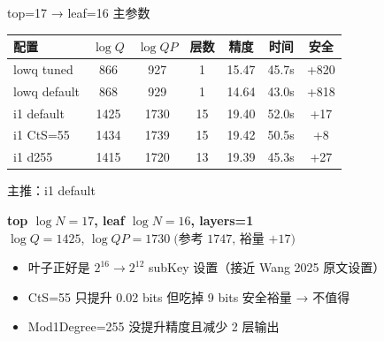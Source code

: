 \documentclass[aspectratio=169, 10pt, xcolor=svgnames, table, UTF8]{ctexbeamer}
\begin{document}
\begin{frame}{top=17 → leaf=16 主参数}
  \begin{center}
    \small
    \begin{tabular}{@{}lcccccc@{}}
      \toprule
      配置 & \(\log Q\) & \(\log QP\) & 层数 & 精度 & 时间 & 安全 \\
      \midrule
      lowq tuned & 866 & 927 & 1 & 15.47 & 45.7s & +820 \\
      lowq default & 868 & 929 & 1 & 14.64 & 43.0s & +818 \\
      \alert{i1 default} & 1425 & 1730 & 15 & \alert{19.40} & 52.0s & \alert{+17} \\
      i1 CtS=55 & 1434 & 1739 & 15 & 19.42 & 50.5s & +8 \\
      i1 d255 & 1415 & 1720 & 13 & 19.39 & 45.3s & +27 \\
      \bottomrule
    \end{tabular}
  \end{center}
  
  \pause
  
  \begin{alertblock}{主推：i1 default}
    \begin{center}
    \textbf{top \(\log N=17\), leaf \(\log N=16\), layers=1}\\
    \(\log Q = 1425\), \(\log QP = 1730 \;\text{(参考 1747, 裕量 +17)}\)
    \end{center}
  \end{alertblock}
  
  \begin{itemize}
    \item 叶子正好是 \(2^{16} \to 2^{12}\) subKey 设置（接近 Wang 2025 原文设置）
    \item CtS=55 只提升 0.02 bits 但吃掉 9 bits 安全裕量 → 不值得
    \item Mod1Degree=255 没提升精度且减少 2 层输出
  \end{itemize}
\end{frame}
\end{document}

